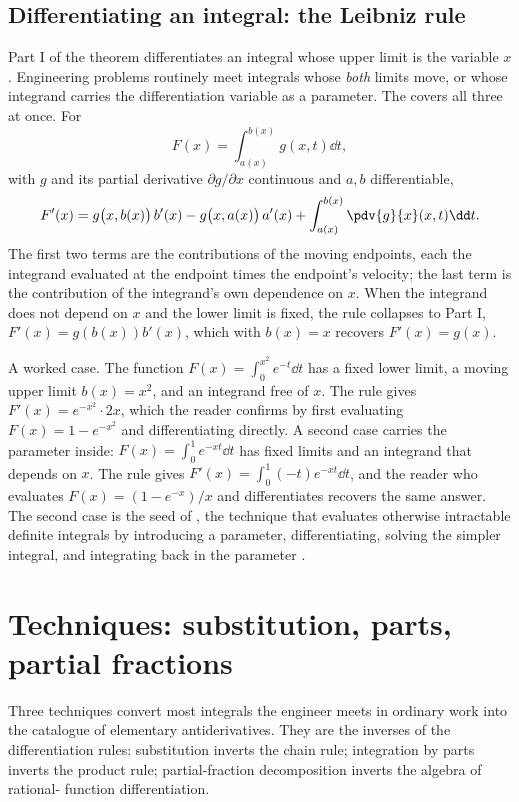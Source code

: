 \subsection{Differentiating an integral: the Leibniz rule}

Part I of the theorem differentiates an integral whose upper limit
is the variable $x$. Engineering problems routinely meet integrals
whose \emph{both} limits move, or whose integrand carries the
differentiation variable as a parameter. The  covers all three at once. For
\[
F(x) = \int_{a(x)}^{b(x)} g(x, t)\dd t,
\]
with $g$ and its partial derivative $\partial g/\partial x$
continuous and $a, b$ differentiable,
\[
F'(x) = g\bigl(x, b(x)\bigr)\,b'(x) - g\bigl(x, a(x)\bigr)\,a'(x)
+ \int_{a(x)}^{b(x)} \pdv{g}{x}(x, t)\dd t.
\]
The first two terms are the contributions of the moving endpoints,
each the integrand evaluated at the endpoint times the endpoint's
velocity; the last term is the contribution of the integrand's own
dependence on $x$. When the integrand does not depend on $x$ and the
lower limit is fixed, the rule collapses to Part I, $F'(x) =
g(b(x))b'(x)$, which with $b(x) = x$ recovers $F'(x) = g(x)$.

A worked case. The function $F(x) = \int_{0}^{x^{2}} e^{-t}\dd t$
has a fixed lower limit, a moving upper limit $b(x) = x^{2}$, and an
integrand free of $x$. The rule gives $F'(x) = e^{-x^{2}}\cdot 2x$,
which the reader confirms by first evaluating $F(x) = 1 - e^{-x^{2}}$
and differentiating directly. A second case carries the parameter
inside: $F(x) = \int_{0}^{1} e^{-x t}\dd t$ has fixed limits and an
integrand that depends on $x$. The rule gives $F'(x) = \int_{0}^{1}
(-t)e^{-xt}\dd t$, and the reader who evaluates $F(x) = (1 -
e^{-x})/x$ and differentiates recovers the same answer. The second
case is the seed of , the technique that evaluates otherwise intractable definite
integrals by introducing a parameter, differentiating, solving the
simpler integral, and integrating back in the parameter
\cite{text:v2ch06-apostol-calculus}.

\section{Techniques: substitution, parts, partial
fractions}

Three techniques convert most integrals the engineer meets in
ordinary work into the catalogue of elementary antiderivatives. They
are the inverses of the differentiation rules: substitution inverts
the chain rule; integration by parts inverts the product rule;
partial-fraction decomposition inverts the algebra of rational-
function differentiation.

